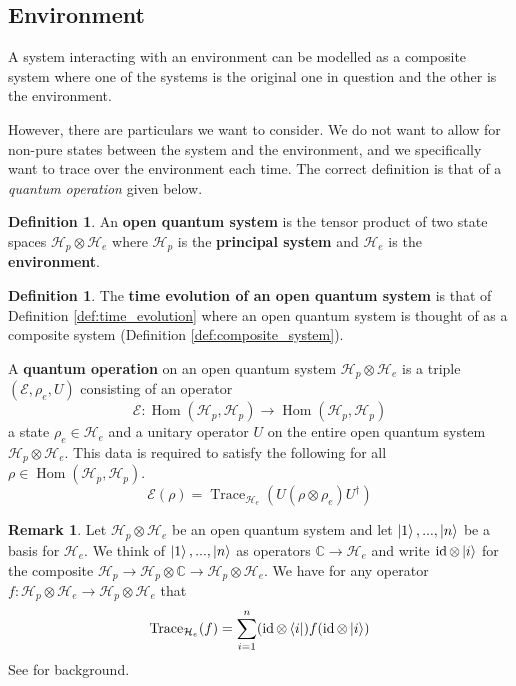 \documentclass[12pt]{article}
\theoremstyle{plain}
\theoremstyle{definition}
\newtheorem{defn}[thm]{Definition} %
\newtheorem{remark}[thm]{Remark}
\newcommand{\bb}[1]{\mathbb{#1}}
\newcommand{\call}[1]{\mathcal{#1}}
\newcommand{\lto}{\longrightarrow}
\begin{document}
	\subsection{Environment}
	A system interacting with an environment can be modelled as a composite system where one of the systems is the original one in question and the other is the environment.
	
	However, there are particulars we want to consider. We do not want to allow for non-pure states between the system and the environment, and we specifically want to trace over the environment each time. The correct definition is that of a \emph{quantum operation} given below.
	
	\begin{defn}
		An \textbf{open quantum system} is the tensor product of two state spaces $\call{H}_p \otimes \call{H}_e$ where $\call{H}_p$ is the \textbf{principal system} and $\call{H}_e$ is the \textbf{environment}.
	\end{defn}
	\begin{defn}\label{def:quantum_operation_partial_trace}
		The \textbf{time evolution of an open quantum system} is that of Definition \ref{def:time_evolution} where an open quantum system is thought of as a composite system (Definition \ref{def:composite_system}).
		
		A \textbf{quantum operation} on an open quantum system $\call{H}_p \otimes \call{H}_e$ is a triple $(\call{E}, \rho_e, U)$ consisting of an operator
		\begin{equation}
			\call{E}: \operatorname{Hom}(\call{H}_p, \call{H}_p) \lto \operatorname{Hom}(\call{H}_p, \call{H}_p)
			\end{equation}
		a state $\rho_e \in \call{H}_e$ and a unitary operator $U$ on the entire open quantum system $\call{H}_p\otimes \call{H}_e$. This data is required to satisfy the following for all $\rho \in \operatorname{Hom}(\call{H}_p, \call{H}_p)$.
		\begin{equation}\label{eq:quant_op_general_form}
			\call{E}(\rho) = \operatorname{Trace}_{\call{H}_e}(U (\rho \otimes \rho_e) U^\dagger)
		\end{equation}
	\end{defn}
	\begin{remark}\label{rmk:operator_sum_derivation}
		Let $\call{H}_p \otimes \call{H}_e$ be an open quantum system and let $\ket{1},...,\ket{n}$ be a basis for $\call{H}_e$. We think of $\ket{1},...,\ket{n}$ as operators $\bb{C} \lto \call{H}_e$ and write $\operatorname{id} \otimes \ket{i}$ for the composite $\call{H}_p \lto \call{H}_p \otimes \bb{C} \lto \call{H}_p \otimes \call{H}_e$. We have for any operator $f: \call{H}_p \otimes \call{H}_e \lto \call{H}_p \otimes \call{H}_e$ that
		\begin{equation}\label{eq:partial_trace_exp_form}
			\operatorname{Trace}_{\call{H}_e}(f) = \sum_{i = 1}^n (\operatorname{id} \otimes \bra{i})f(\operatorname{id} \otimes \ket{i})
		\end{equation}
		See \cite{CommutativeAlgebra} for background.
	\end{remark}
\end{document}
